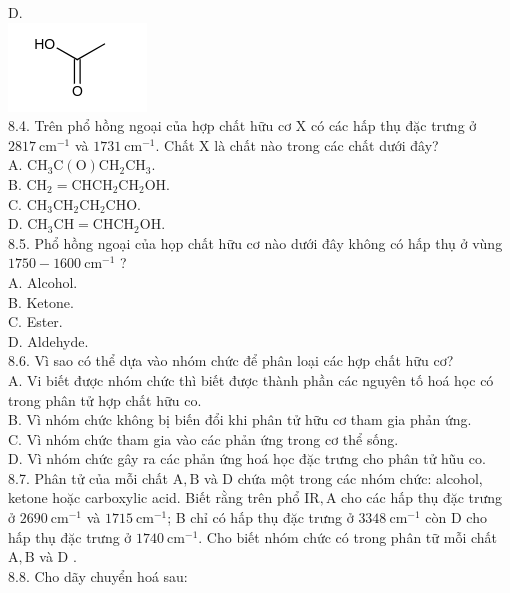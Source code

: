 \documentclass[10pt]{article}
\begin{document}
D.\\
\includegraphics{smile-6acec17f1436fbba09816c88b9d86f07d6dc18d9}\\
8.4. Trên phổ hồng ngoại của hợp chất hữu cơ X có các hấp thụ đặc trưng ở $2817 \mathrm{~cm}^{-1}$ và $1731 \mathrm{~cm}^{-1}$. Chất X là chất nào trong các chất dưới đây?\\
A. $\mathrm{CH}_{3} \mathrm{C}(\mathrm{O}) \mathrm{CH}_{2} \mathrm{CH}_{3}$.\\
B. $\mathrm{CH}_{2}=\mathrm{CHCH}_{2} \mathrm{CH}_{2} \mathrm{OH}$.\\
C. $\mathrm{CH}_{3} \mathrm{CH}_{2} \mathrm{CH}_{2} \mathrm{CHO}$.\\
D. $\mathrm{CH}_{3} \mathrm{CH}=\mathrm{CHCH}_{2} \mathrm{OH}$.\\
8.5. Phổ hồng ngoại của họp chất hữu cơ nào dưới đây không có hấp thụ ở vùng $1750-1600 \mathrm{~cm}^{-1}$ ?\\
A. Alcohol.\\
B. Ketone.\\
C. Ester.\\
D. Aldehyde.\\
8.6. Vì sao có thể dựa vào nhóm chức để phân loại các hợp chất hữu cơ?\\
A. Vi biết được nhóm chức thì biết được thành phần các nguyên tố hoá học có trong phân tử hợp chất hữu co.\\
B. Vì nhóm chức không bị biến đổi khi phân tử hữu cơ tham gia phản ứng.\\
C. Vì nhóm chức tham gia vào các phản ứng trong cơ thể sống.\\
D. Vì nhóm chức gây ra các phản ứng hoá học đặc trưng cho phân tử hũu co.\\
8.7. Phân tử của mỗi chất $\mathrm{A}, \mathrm{B}$ và D chứa một trong các nhóm chức: alcohol, ketone hoặc carboxylic acid. Biết rằng trên phổ $\mathrm{IR}, \mathrm{A}$ cho các hấp thụ đặc trưng ở $2690 \mathrm{~cm}^{-1}$ và $1715 \mathrm{~cm}^{-1}$; B chỉ có hấp thụ đặc trưng ở $3348 \mathrm{~cm}^{-1}$ còn D cho hấp thụ đặc trưng ở $1740 \mathrm{~cm}^{-1}$. Cho biết nhóm chức có trong phân tữ mỗi chất $\mathrm{A}, \mathrm{B}$ và D .\\
8.8. Cho dãy chuyển hoá sau:
\end{document}
